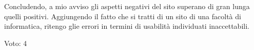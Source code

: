 Concludendo, a mio avviso gli aspetti negativi del sito superano di gran lunga quelli positivi. Aggiungendo il fatto che si tratti di un sito di una facoltà di informatica, ritengo glie errori in termini di usabilità individuati inaccettabili.
\begin{center}
	Voto: 4
\end{center}